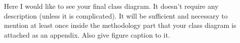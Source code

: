 \documentclass[journal]{IEEEtran}
\begin{document}

Here I would like to see your final class diagram. It doesn’t require any description (unless it is complicated). It will be sufficient and necessary to mention at least once inside the methodology part that your class diagram is attached as an appendix. Also give figure caption to it.





\ifCLASSOPTIONcaptionsoff
  \newpage
\fi




\end{document}
